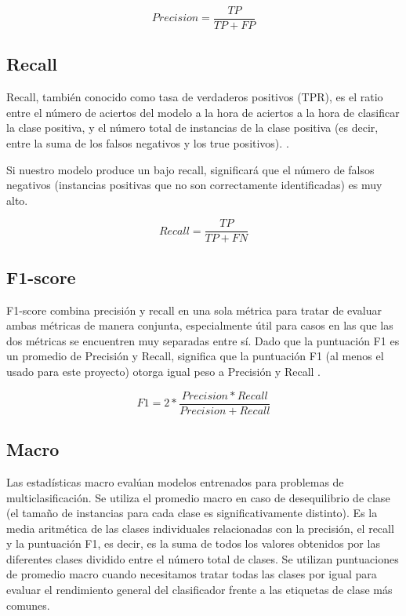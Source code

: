 \begin{equation}
Precision = \frac{TP}{TP+FP}
 \label{Precisión-Formula}
\end{equation}


\subsection{Recall}
Recall, también conocido como tasa de verdaderos positivos (TPR), es el ratio entre el número de aciertos del modelo a la hora de aciertos a la hora de clasificar la clase positiva, y el número total de instancias de la clase positiva (es decir, entre la suma de los falsos negativos y los true positivos). \cite{forman2003extensive}.

Si nuestro modelo produce un bajo recall, significará que el número de falsos negativos (instancias positivas que no son correctamente identificadas) es muy alto. 

\begin{equation}
Recall = \frac{TP}{TP+FN}
 \label{Recall-Formula}
\end{equation}

\subsection{F1-score}
F1-score combina precisión y recall en una sola métrica para tratar de evaluar ambas métricas de manera conjunta, especialmente útil para casos en las que las dos métricas se encuentren muy separadas entre sí. Dado que la puntuación F1 es un promedio de Precisión y Recall, significa que la puntuación F1 (al menos el usado para este proyecto) otorga igual peso a Precisión y Recall \cite{forman2003extensive}. 

\begin{equation}
F1 = 2 * \frac{Precision * Recall}{Precision + Recall}
\label{F1-Score-Formula}
\end{equation}


\subsection{Macro}
Las estadísticas macro \cite{forman2003extensive} evalúan modelos entrenados para problemas de multiclasificación. Se utiliza el promedio macro en caso de desequilibrio de clase (el tamaño de instancias para cada clase es significativamente distinto). Es la media aritmética de las clases individuales relacionadas con la precisión, el recall y la puntuación F1, es decir, es la suma de todos los valores obtenidos por las diferentes clases dividido entre el número total de clases. Se utilizan puntuaciones de promedio macro cuando necesitamos tratar todas las clases por igual para evaluar el rendimiento general del clasificador frente a las etiquetas de clase más comunes.

